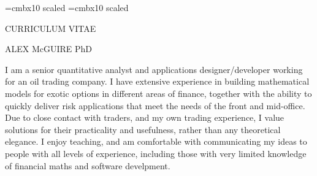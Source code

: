 \font\titlesize=cmbx10 scaled
\font\namesize=cmbx10 scaled
\vsize=10in
\hsize=8in
\voffset -0.4in
\hoffset -0.9in
\vskip 1cm
\centerline{\titlesize CURRICULUM VITAE}
\vskip 0.4in
\centerline{\namesize ALEX McGUIRE PhD}
\vskip 0.2in
\def\jobskip{\noalign{\bigskip}}
\def\posskip{\noalign{\medskip}}
\midinsert
\narrower\narrower\narrower
\noindent I am a senior quantitative analyst and applications designer/developer working for an oil trading company. I have extensive experience in building mathematical models for exotic options in 
different areas of finance, together with the ability to quickly deliver risk applications that meet the needs of the front and mid-office. Due to close contact with traders, and my own trading experience, I value
solutions for their practicality and usefulness, rather than any theoretical elegance. I enjoy teaching, and am comfortable with communicating my ideas to people with all
levels of experience, including those with very limited knowledge of financial maths and software develpment.
\endinsert


